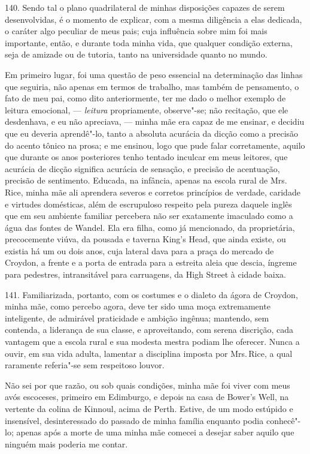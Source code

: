 140. Sendo tal o plano quadrilateral de minhas disposições capazes de
serem desenvolvidas, é o momento de explicar, com a mesma diligência a
elas dedicada, o caráter algo peculiar de meus pais; cuja influência
sobre mim foi mais importante, então, e durante toda minha vida, que
qualquer condição externa, seja de amizade ou de tutoria, tanto na
universidade quanto no mundo.

Em primeiro lugar, foi uma questão de peso essencial na determinação das
linhas que seguiria, não apenas em termos de trabalho, mas também de
pensamento, o fato de meu pai, como dito anteriormente, ter me dado o
melhor exemplo de leitura emocional, --- \emph{leitura} propriamente,
observe"-se; não recitação, que ele desdenhava, e eu não apreciava, ---
minha mãe era capaz de me ensinar, e decidiu que eu deveria aprendê"-lo,
tanto a absoluta acurácia da dicção como a precisão do acento tônico na
prosa; e me ensinou, logo que pude falar corretamente, aquilo que
durante os anos posteriores tenho tentado inculcar em meus leitores, que
acurácia de dicção significa acurácia de sensação, e precisão de
acentuação, precisão de sentimento. Educada, na infância, apenas na
escola rural de Mrs.\,Rice, minha mãe ali aprendera severos e corretos
princípios de verdade, caridade e virtudes domésticas, além de
escrupuloso respeito pela pureza daquele inglês que em seu ambiente
familiar percebera não ser exatamente imaculado como a água das fontes
de Wandel. Ela era filha, como já mencionado, da proprietária,
precocemente viúva, da pousada e taverna King's Head, que ainda existe,
ou existia há um ou dois anos, cuja lateral dava para a praça do mercado
de Croydon, a frente e a porta de entrada para a estreita aleia que
descia, íngreme para pedestres, intransitável para carruagens, da High
Street à cidade baixa.

141. Familiarizada, portanto, com os costumes e o dialeto da ágora de
Croydon, minha mãe, como percebo agora, deve ter sido uma moça
extremamente inteligente, de admirável praticidade e ambição ingênua;
mantendo, sem contenda, a liderança de sua classe, e aproveitando, com
serena discrição, cada vantagem que a escola rural e sua modesta mestra
podiam lhe oferecer. Nunca a ouvir, em sua vida adulta, lamentar a
disciplina imposta por Mrs.\,Rice, a qual raramente referia"-se sem
respeitoso louvor.

Não sei por que razão, ou sob quais condições, minha mãe foi viver com
meus avós escoceses, primeiro em Edimburgo, e depois na casa de Bower's
Well, na vertente da colina de Kinnoul, acima de Perth. Estive, de um
modo estúpido e insensível, desinteressado do passado de minha família
enquanto podia conhecê"-lo; apenas após a morte de uma minha mãe comecei
a desejar saber aquilo que ninguém mais poderia me contar.

